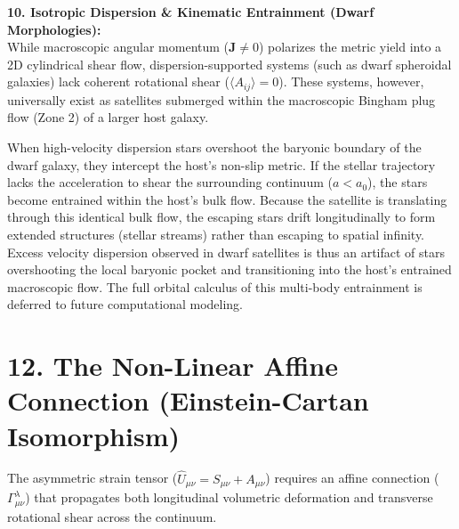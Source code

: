 \vspace{0.2 cm}

\textbf{10. Isotropic Dispersion \& Kinematic Entrainment (Dwarf Morphologies):} \\
While macroscopic angular momentum ($\mathbf{J} \neq 0$) polarizes the metric yield into a 2D cylindrical shear flow, dispersion-supported systems (such as dwarf spheroidal galaxies) lack coherent rotational shear ($\langle A_{ij} \rangle = 0$).  These systems, however, universally exist as satellites submerged within the macroscopic Bingham plug flow (Zone 2) of a larger host galaxy.

When high-velocity dispersion stars overshoot the baryonic boundary of the dwarf galaxy, they intercept the host's non-slip metric. If the stellar trajectory lacks the acceleration to shear the surrounding continuum ($a < a_0$), the stars become entrained within the host's bulk flow. Because the satellite is translating through this identical bulk flow, the escaping stars drift longitudinally to form extended structures (stellar streams) rather than escaping to spatial infinity. Excess velocity dispersion observed in dwarf satellites is thus an artifact of stars overshooting the local baryonic pocket and transitioning into the host's entrained macroscopic flow.  The full orbital calculus of this multi-body entrainment is deferred to future computational modeling.





\section*{12. The Non-Linear Affine Connection (Einstein-Cartan Isomorphism)}

The asymmetric strain tensor ($\hat{U}_{\mu\nu} = S_{\mu\nu} + A_{\mu\nu}$) requires an affine connection ($\Gamma^\lambda_{\mu\nu}$) that propagates both longitudinal volumetric deformation and transverse rotational shear across the continuum.

